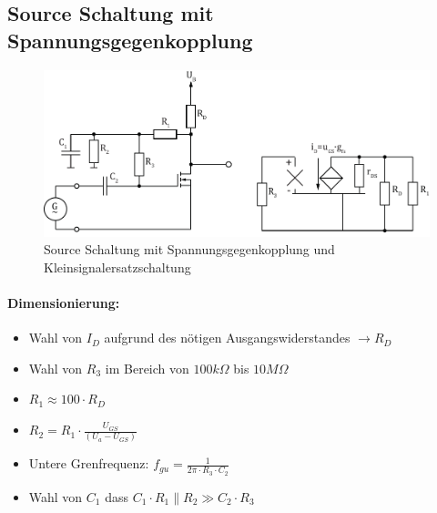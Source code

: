 



\subsection{Source Schaltung mit Spannungsgegenkopplung}
\begin{figure}[h!]
	\centering
	\includegraphics[width = \linewidth]{../fig/fet_source_u.pdf}
	\caption{Source Schaltung mit Spannungsgegenkopplung und Kleinsignalersatzschaltung}
	\label{fet:sourceschaltung_u}
\end{figure}
\noindent
\paragraph{Dimensionierung:}
\begin{itemize}
	\item Wahl von $I_D$ aufgrund des nötigen Ausgangswiderstandes $\rightarrow R_D$
	\item Wahl von $R_3$ im Bereich von $100k\Omega$ bis $10M\Omega$
	\item $R_1 \approx 100\cdot R_D$
	\item $R_2 = R_1 \cdot \frac{U_{GS}}{(U_a-U_{GS})}$
	\item Untere Grenfrequenz: $f_{gu} = \frac{1}{2\pi \cdot R_3 \cdot C_2}$
	\item Wahl von $C_1$ dass $C_1 \cdot R_1 \parallel R_2 \gg C_2 \cdot R_3$
\end{itemize}
